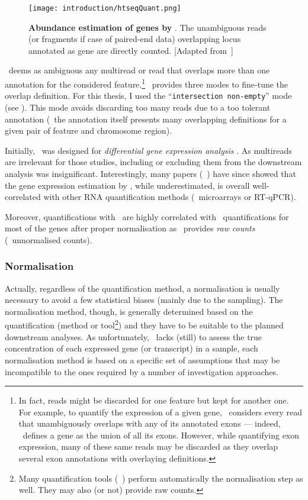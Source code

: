 \begin{figure}
    \texttt{[image: introduction/htseqQuant.png]}\centering
    \caption[Abundance estimation of genes by
    HTSeq-count]{\label{fig:htseqEstimation}\textbf{Abundance estimation of genes
    by \htseq}. The unambiguous reads (or fragments if case of paired-end data)
    overlapping locus annotated as gene are directly counted. [Adapted
    from~\cite{MarPhD}]}
  \end{figure}

\htseq\ deems as ambiguous any multiread or read that overlaps more than
one annotation for the considered feature.\footnote{In fact, reads might be
discarded for one feature but kept for another one. For example, to quantify the
expression of a given gene, \htseq\ considers every read that unambiguously
overlaps with any of its annotated exons --- indeed, \htseq\ defines a gene
as the union of all its exons. However, while quantifying exon expression, many
of these same reads may be discarded as they overlap several exon annotations
with overlaying definitions.}
\htseq\ provides
three modes to fine-tune the overlap definition.
For this thesis, I used the \enquote{\texttt{intersection non-empty}} mode
(see ).
This mode avoids discarding too many reads due to a too tolerant annotation
(\ie\ the annotation itself presents many overlapping definitions for a given
pair of feature and chromosome region).

Initially, \htseq\ was designed for \emph{differential gene
expression analysis} . As multireads are irrelevant for
those studies, including or excluding them from the downstream analysis was
insignificant. Interestingly, many papers
(\eg~)
have since showed that
the gene expression estimation by \htseq, while underestimated, is overall
well-correlated with other \gls{RNA} quantification methods
(\eg\ microarrays or \gls{RT-qPCR}).

Moreover, quantifications with \htseq\ are highly correlated with \cuffl\
quantifications for most of the genes after proper normalisation
\mycite{tophatStarwhatever} as \htseq\ provides \emph{raw counts} (\ie\
unnormalised counts).


\subsubsection{Normalisation}\label{subsub:norm}
Actually, regardless of the quantification method, a normalisation is usually
necessary to avoid a few statistical biases (mainly due to the sampling). The
normalisation method, though, is generally determined based on the quantification
(method or tool\footnote{Many quantification tools (\eg\ \cuffl) perform
automatically the normalisation step as well. They may also (or not) provide
raw counts.}) and they have to be suitable to the planned downstream analyses.
As unfortunately, \Rnaseq\ lacks (still) to assess the true concentration of each
expressed gene (or transcript) in a sample, each normalisation method is based on
a specific set of assumptions that may be incompatible to the ones required by
a number of investigation approaches.

